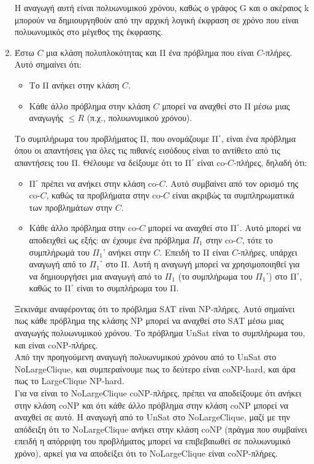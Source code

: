 \documentclass{article}
\begin{document}
\begin{enumerate}[label=(\alph*)]
\begin{itemize}
\end{itemize}
Η αναγωγή αυτή είναι πολυωνυμικού χρόνου, καθώς ο γράφος G και ο ακέραιος k μπορούν να δημιουργηθούν από την αρχική λογική έκφραση σε χρόνο που είναι πολυωνυμικός στο μέγεθος της έκφρασης. 
\item Έστω $C$ μια κλάση πολυπλοκότητας και Π ένα πρόβλημα που είναι $C$-πλήρες. Αυτό σημαίνει ότι:
\begin{itemize}
\item Το Π ανήκει στην κλάση $C$.
\item Κάθε άλλο πρόβλημα στην κλάση $C$ μπορεί να αναχθεί στο Π μέσω μιας αναγωγής $\leq R$ (π.χ., πολυωνυμικού χρόνου).
\end{itemize}
Το συμπλήρωμα του προβλήματος Π, που ονομάζουμε Π΄, είναι ένα πρόβλημα όπου οι απαντήσεις για όλες τις πιθανές εισόδους είναι το αντίθετο από τις απαντήσεις του Π. Θέλουμε να δείξουμε ότι το Π΄ είναι co-$C$-πλήρες, δηλαδή ότι:
\begin{itemize}
\item Π΄ πρέπει να ανήκει στην κλάση co-$C$. Αυτό συμβαίνει από τον ορισμό της co-$C$, καθώς τα προβλήματα στην co-$C$ είναι ακριβώς τα συμπληρωματικά των προβλημάτων στην $C$.
\item Κάθε άλλο πρόβλημα στην co-$C$ μπορεί να αναχθεί στο Π΄. Αυτό μπορεί να αποδειχθεί ως εξής: αν έχουμε ένα πρόβλημα $Π_1$ στην co-$C$, τότε το συμπλήρωμά του $Π_1$' ανήκει στην $C$. Επειδή το Π είναι $C$-πλήρες, υπάρχει αναγωγή από το $Π_1$΄ στο Π. Αυτή η αναγωγή μπορεί να χρησιμοποιηθεί για να δημιουργήσει μια αναγωγή από το $Π_1$ (το συμπλήρωμα του $Π_1$΄) στο Π΄, καθώς το Π΄  είναι το συμπλήρωμα του Π.
\end{itemize}
Ξεκινάμε αναφέροντας ότι το πρόβλημα SAT είναι NP-πλήρες. Αυτό σημαίνει πως κάθε πρόβλημα της κλάσης NP μπορεί να αναχθεί στο SAT μέσω μιας αναγωγής πολυωνυμικού χρόνου. Το πρόβλημα UnSat είναι το συμπλήρωμα του, και είναι coNP-πλήρες. \\
Από την προηγούμενη αναγωγή πολυωνυμικού χρόνου από το UnSat στο ΝοLargeClique, και συμπεραίνουμε πως το δεύτερο είναι coNP-hard, και άρα πως το LargeClique NP-hard. \\
Για να είναι το NoLargeClique coNP-πλήρες, πρέπει να αποδείξουμε ότι ανήκει στην κλάση coNP και ότι κάθε άλλο πρόβλημα στην κλάση coNP μπορεί να αναχθεί σε αυτό. Η αναγωγή από το UnSat στο NoLargeClique, μαζί με την απόδειξη ότι το NoLargeClique ανήκει στην κλάση coNP (πράγμα που συμβαίνει επειδή η απόρριψη του προβλήματος μπορεί να επιβεβαιωθεί σε πολυωνυμικό χρόνο), αρκεί για να αποδείξει ότι το NoLargeClique είναι coNP-πλήρες.

\end{enumerate}
\end{document}
